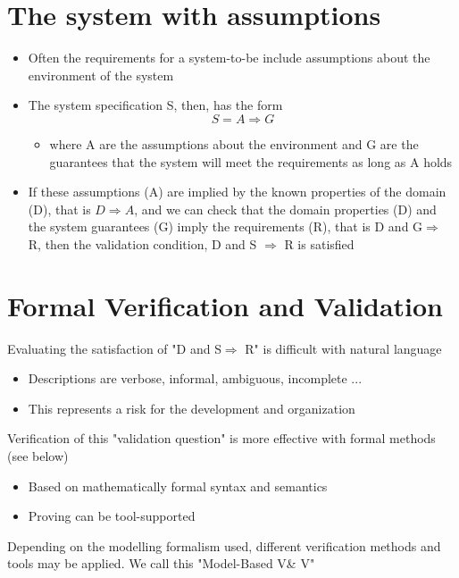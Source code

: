 \documentclass{article}[18pt]
\begin{document}
\section{The system with assumptions}
\begin{itemize}
	\item Often the requirements for a system-to-be include assumptions about the environment of the system
	\item The system specification S, then, has the form
	$$S=A\Rightarrow G$$
	\begin{itemize}
		\item where A are the assumptions about the environment and G are the guarantees that the system will meet the requirements as long as A holds
	\end{itemize}
	\item If these assumptions (A) are implied by the known properties of the domain (D), that is $D\Rightarrow A$, and we can check that the domain properties (D) and the system guarantees (G) imply the requirements (R), that is D and G$\Rightarrow$ R, then the validation condition, D and S $\Rightarrow$ R is satisfied
\end{itemize}
\section{Formal Verification and Validation}
Evaluating the satisfaction of "D and S$\Rightarrow$ R" is difficult with natural language
\begin{itemize}
	\item Descriptions are verbose, informal, ambiguous, incomplete ...
	\item This represents a risk for the development and organization
\end{itemize}
Verification of this "validation question" is more effective with formal methods (see below)
\begin{itemize}
	\item Based on mathematically formal syntax and semantics
	\item Proving can be tool-supported
\end{itemize}
Depending on the modelling formalism used, different verification methods and tools may be applied. We call this "Model-Based V\& V"
\end{document}
